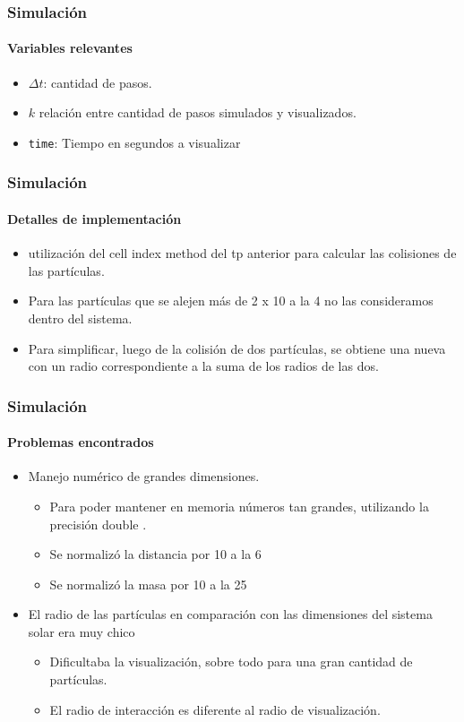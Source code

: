\documentclass[hyperref={pdfpagelayout=SinglePage}]{beamer}
\begin{document}
\begin{frame}
\frametitle{Simulación}
\framesubtitle{Variables relevantes}
\begin{itemize}
	\item $\Delta t$: cantidad de pasos.
	\item $k$ relación entre cantidad de pasos simulados y visualizados.
	\item \texttt{time}: Tiempo en segundos a visualizar
\end{itemize}
\end{frame}

\begin{frame}
\frametitle{Simulación}
\framesubtitle{Detalles de implementación}
\begin{itemize}
	\item utilización del cell index method del tp anterior para calcular las colisiones de las partículas.
	\item Para las partículas que se alejen más de 2 x 10 a la 4 no las consideramos dentro del sistema.
	\item Para simplificar, luego de la colisión de dos partículas, se obtiene una nueva con un radio correspondiente a la suma de los radios de las dos. 
\end{itemize}
\end{frame}

\begin{frame}
\frametitle{Simulación}
\framesubtitle{Problemas encontrados}
\begin{itemize}
	\item Manejo numérico de grandes dimensiones.
	\begin{itemize}
		\item Para poder mantener en memoria números tan grandes, utilizando la precisión double .
		\item Se normalizó la distancia por 10 a la 6
		\item Se normalizó la masa por 10 a la 25
	\end{itemize}
	\item El radio de las partículas en comparación con las dimensiones del sistema solar era muy chico
	\begin{itemize}
			\item Dificultaba la visualización, sobre todo para una gran cantidad de partículas.
			\item El radio de interacción es diferente al radio de visualización.
	\end{itemize}
\end{itemize}
\end{frame}
\end{document}
